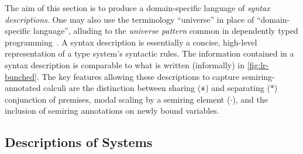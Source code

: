 The aim of this section is to produce a domain-specific language of
\emph{syntax descriptions}.
One may also use the terminology ``universe'' in place of ``domain-specific
language'', alluding to the \emph{universe pattern} common in dependently typed
programming~\citep{BDJ03}.
A syntax description is essentially a concise, high-level representation of a
type system's syntactic rules.
The information contained in a syntax description is comparable to what is
written (informally) in \cref{fig:lr-bunched}.
The key features allowing these descriptions to capture semiring-annotated
calculi are the distinction between sharing ($\dottimes$) and separating ($*$)
conjunction of premises, modal scaling by a semiring element ($\cdot$), and the
inclusion of semiring annotations on newly bound variables.



\subsection{Descriptions of Systems}



